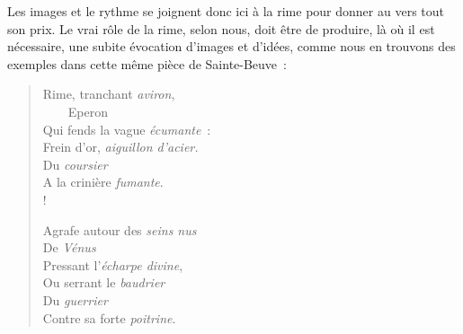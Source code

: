 \documentclass[french,twoside]{book} %
\begin{document}
\noindent Les images et le rythme se joignent donc ici à la rime pour donner au vers tout son prix. Le vrai rôle de la rime, selon nous, doit être de produire, là où il est nécessaire, une subite évocation d’images et d’idées, comme nous en trouvons des exemples dans cette même pièce de Sainte-Beuve :\par


\begin{verse}
Rime, tranchant \emph{aviron},\\
    Eperon\\
Qui fends la vague \emph{écumante} :\\
Frein d’or, \emph{aiguillon d’acier.}\\
Du \emph{coursier}\\
A la crinière \emph{fumante}.\\!

Agrafe autour des \emph{seins nus}\\
De \emph{Vénus}\\
Pressant l’\emph{écharpe divine},\\
Ou serrant le \emph{baudrier}\\
Du \emph{guerrier}\\
Contre sa forte \emph{poitrine}.\\
\end{verse}
\end{document}
